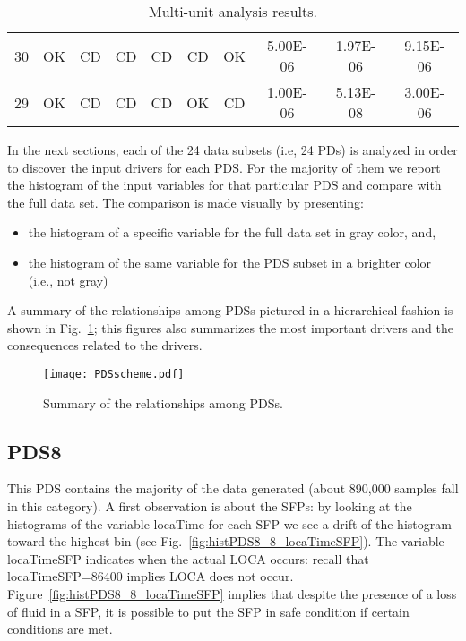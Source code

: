 \begin{table}
\begin{tabular}{c|cccccc|ccc}
     30   & OK   & \cellcolor[gray]{0.95}CD   & \cellcolor[gray]{0.95}CD   & \cellcolor[gray]{0.95}CD   & \cellcolor[gray]{0.95}CD   & OK   & 5.00E-06    & 1.97E-06    & 9.15E-06    \\         
     29   & OK   & \cellcolor[gray]{0.95}CD   & \cellcolor[gray]{0.95}CD   & \cellcolor[gray]{0.95}CD   & OK   & \cellcolor[gray]{0.95}CD   & 1.00E-06    & 5.13E-08    & 3.00E-06    \\    
    \hline
  \end{tabular}
  \caption{Multi-unit analysis results.}
  \label{tab:resultsMain}
\end{table}

In the next sections, each of the 24 data subsets (i.e, 24 PDs) is analyzed in order to 
discover the input drivers for each PDS. For the majority of them we report the histogram 
of the input variables for that particular 
PDS and compare with the full data set. The comparison is made visually by presenting:
\begin{itemize}
  \item the histogram of a specific variable for the full data set in gray color, and, 
  \item the histogram of the same variable for the PDS subset in a brighter color (i.e., not gray)
\end{itemize}

A summary of the relationships among PDSs pictured in a hierarchical fashion is shown in 
Fig.~\ref{fig:PDSsummary}; this figures also summarizes the most important drivers and the
consequences related to the drivers.

\begin{figure}
    \centering
    \centerline{\texttt{[image: PDSscheme.pdf]}}
    \caption{Summary of the relationships among PDSs.}
    \label{fig:PDSsummary}
\end{figure}

\subsection{PDS8}
This PDS contains the majority of the data generated (about 890,000 samples fall in this category).
A first observation is about the SFPs: by looking at the histograms of the variable locaTime for each SFP
we see a drift of the histogram toward the highest bin (see Fig.~\ref{fig:histPDS8_8_locaTimeSFP}). 
The variable locaTimeSFP indicates when the actual LOCA
occurs: recall that locaTimeSFP=86400 implies LOCA does not occur.
Figure~\ref{fig:histPDS8_8_locaTimeSFP} implies that despite the presence of a 
loss of fluid in a SFP, it is possible to put the SFP in safe condition if certain conditions are met.

